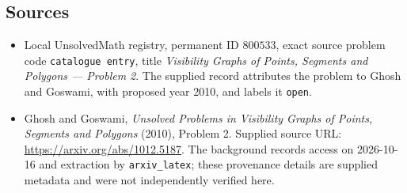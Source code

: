 \documentclass[11pt]{article}
\begin{document}
\subsection{Sources}
\begin{itemize}
\item Local UnsolvedMath registry, permanent ID \(800533\), exact source problem code \texttt{catalogue entry}, title \emph{Visibility Graphs of Points, Segments and Polygons --- Problem 2}. The supplied record attributes the problem to Ghosh and Goswami, with proposed year 2010, and labels it \texttt{open}.
\item Ghosh and Goswami, \emph{Unsolved Problems in Visibility Graphs of Points, Segments and Polygons} (2010), Problem 2. Supplied source URL: \url{https://arxiv.org/abs/1012.5187}. The background records access on 2026-10-16 and extraction by \texttt{arxiv\_latex}; these provenance details are supplied metadata and were not independently verified here.
\end{itemize}
\end{document}

